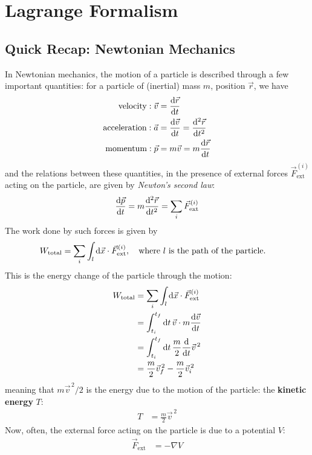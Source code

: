 \section{Lagrange Formalism}
\subsection{Quick Recap: Newtonian Mechanics}
In Newtonian mechanics, the motion of a particle is described through a few important quantities:
for a particle of (inertial) mass $m$, position $\vec{r}$, we have
\begin{align}
  \text{velocity}: \vec{v}     & = \odv{\vec{r}}{t}                       \\
  \text{acceleration}: \vec{a} & = \odv{\vec{v}}{t} = \odv[2]{\vec{r}}{t} \\
  \text{momentum}: \vec{p}     & = m\vec{v} = m\odv{\vec{r}}{t}
\end{align}
and the relations between these quantities, in the presence of external forces $\vec{F}_{\text{ext}}^{(i)}$ acting on the particle, are given by \textit{Newton's second law}:
\begin{align}
  \odv{\vec{p}}{t} = m \odv[2]{\vec{r}}{t} = \sum_i \vec{F}_{\text{ext}}^{(i)}
\end{align}
The work done by such forces is given by
\begin{align}
  W_{\text{total}} & = \sum_i \int_l \odif{\vec{x}} \cdot \vec{F}_{\text{ext}}^{(i)}, \quad \text{where } l \text{ is the path of the particle.}
\end{align}
This is the energy change of the particle through the motion:
\begin{align}
  W_{\text{total}}
   & = \sum_i \int_l \odif{\vec{x}} \cdot \vec{F}_{\text{ext}}^{(i)}     \\
   & = \int_{t_i}^{t_f} \odif{t} \, \vec{v} \cdot m \odv{\vec{v}}{t}     \\
   & = \int_{t_i}^{t_f} \odif{t} \, \frac{m}{2} \odv{}{t} \vec{v}^{\, 2} \\
   & = \frac{m}{2} \vec{v}_f^{\, 2} - \frac{m}{2} \vec{v}_i^{\, 2}
\end{align}
meaning that $m \vec{v}^{\, 2} / 2$ is the energy due to the motion of the particle: the \textbf{kinetic energy} $T$:
\begin{align}
  T & = \frac{m}{2} \vec{v}^{\, 2}
\end{align}
Now, often, the external force acting on the particle is due to a potential $V$:
\begin{align}
  \vec{F}_{\text{ext}} & = -\nabla V
\end{align}
